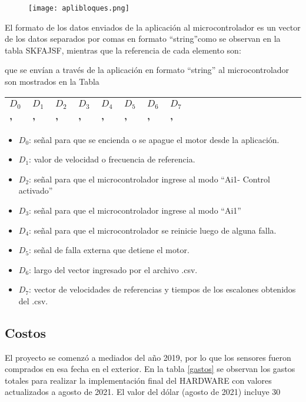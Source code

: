 \begin{figure}[h]
	\centering
	\texttt{[image: aplibloques.png]}
	\label{fig:bloqvis}
\end{figure}


El formato de los datos enviados de la aplicación al microcontrolador es un vector de los datos separados por comas en formato “string”como se observan en la tabla SKFAJSF, mientras que la referencia de cada elemento son:

que se envían a través de la aplicación en formato “string” al microcontrolador son mostrados en la Tabla
\begin{table}[h]
	\centering
	\begin{tabular}{|l|l|l|l|l|l|l|l|l|l|l|l|l|l|l|l|l|l|l|l|}
		\hline
			$D_0$ , & $D_1$ , & $D_2$ , & $D_3$ , & $D_4$ , & $D_5$ , & $D_6$ ,  & $D_7$ , \\ \hline
	\end{tabular}
\end{table}

\begin{itemize}
\item $D_0$: señal para que se encienda o se apague el motor desde la aplicación.
\item $D_1$: valor de velocidad o frecuencia de referencia.
\item $D_2$: señal para que el microcontrolador ingrese al modo “Ai1- Control activado”
\item $D_3$: señal para que el microcontrolador ingrese al modo “Ai1”
\item $D_4$: señal para que el microcontrolador se reinicie luego de alguna falla.
\item $D_5$: señal de falla externa que detiene el motor.
\item $D_6$: largo del vector ingresado por el archivo .csv.
\item $D_7$: vector de velocidades de referencias y tiempos de los escalones obtenidos del .csv.
\end{itemize}	

\subsection{Costos}
El proyecto se comenzó a mediados del año 2019, por lo que los sensores fueron comprados en esa fecha en el exterior. En la tabla \ref{gastos} se observan los gastos totales para realizar la implementación final del HARDWARE con valores actualizados a agosto de 2021. El valor del dólar (agosto de 2021) incluye 30%

